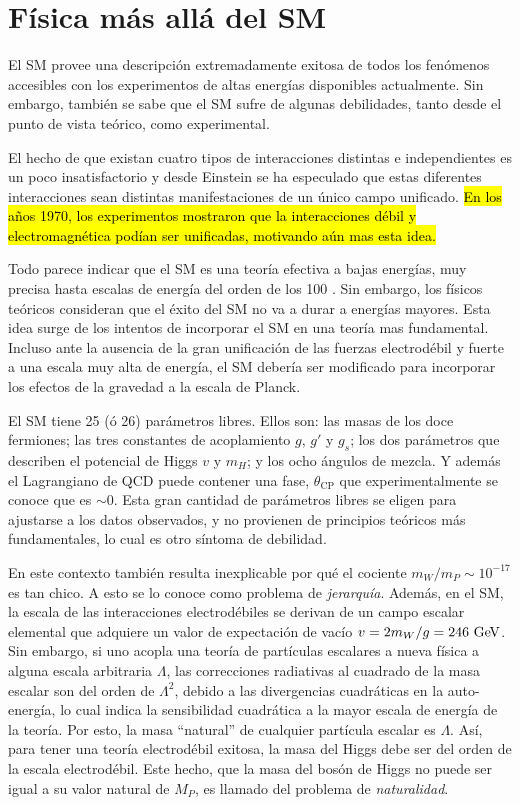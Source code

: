 \section{Física más allá del SM}

El SM provee una descripción extremadamente exitosa de todos los fenómenos
accesibles con los experimentos de altas energías disponibles actualmente.
Sin embargo,
también se sabe que el SM sufre de algunas debilidades, tanto desde el punto de
vista teórico, como experimental.

El hecho de que existan cuatro tipos de interacciones distintas e independientes
es un poco insatisfactorio y desde Einstein se ha especulado que estas
diferentes interacciones sean distintas manifestaciones de un único campo
unificado. \hl{En los a\~nos 1970, los experimentos mostraron que la interacciones
débil y electromagnética podían ser unificadas, motivando aún mas esta idea.}

Todo parece indicar que el SM es una teoría efectiva a bajas energías, muy precisa hasta
escalas de energía del orden de los 100 {\gev}. Sin embargo, los físicos
teóricos consideran que el éxito del SM no va a durar a energías mayores. Esta
idea surge de los intentos de incorporar el SM en una teoría mas
fundamental. Incluso ante la ausencia de la gran unificación de las fuerzas
electrodébil y fuerte a una escala muy alta de energía, el SM debería ser
modificado para incorporar los efectos de la gravedad a la escala de Planck.

El SM tiene 25 (ó 26) parámetros libres. Ellos son: las masas de los doce fermiones;
las tres constantes de acoplamiento $g$, $g'$ y $g_s$; los dos parámetros que
describen el potencial de Higgs $v$ y $m_H$; y los ocho ángulos de mezcla. Y
además el Lagrangiano de QCD puede contener una fase, $\theta_{\text{CP}}$ que
experimentalmente se conoce que es $\sim 0$. Esta gran cantidad de parámetros
libres se eligen para ajustarse a los datos observados, y no provienen de
principios teóricos más fundamentales, lo cual es otro síntoma de debilidad.

En este contexto también resulta inexplicable por qué el cociente $m_W/m_P \sim
10^{-17}$ es tan chico. A esto se lo conoce como problema de \emph{jerarquía}.
Además, en el SM, la escala de las interacciones electrodébiles se derivan de un
campo escalar elemental que adquiere un valor de expectación de vacío $v = 2
m_W /g = 246 \gev$. Sin embargo, si uno acopla una teoría de partículas
escalares a nueva física a alguna escala arbitraria $\Lambda$, las correcciones
radiativas al cuadrado de la masa escalar son del orden de $\Lambda^2$, debido a
las divergencias cuadráticas en la auto-energía, lo cual indica la sensibilidad
cuadrática a la mayor escala de energía de la teoría. Por esto, la masa
``natural'' de cualquier partícula escalar es $\Lambda$. Así, para tener una teoría
electrodébil exitosa, la masa del Higgs debe ser del orden de la escala
electrodébil. Este hecho, que la masa del bosón de Higgs no puede ser igual a su
valor natural de $M_P$, es llamado del problema de \emph{naturalidad}.

